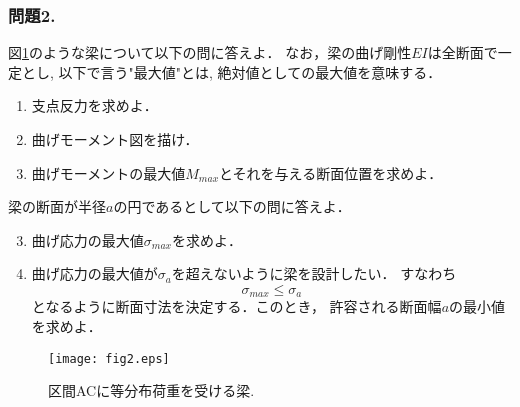 \documentclass[10pt,a4j]{jarticle}
\begin{document}
\subsubsection*{問題2.}
図\ref{fig:fig2}のような梁について以下の問に答えよ．
なお，梁の曲げ剛性$EI$は全断面で一定とし, 以下で言う"最大値"とは, 
絶対値としての最大値を意味する．
\begin{enumerate}
\item
	支点反力を求めよ．
\item
	曲げモーメント図を描け．
\item
	曲げモーメントの最大値$M_{max}$とそれを与える断面位置を求めよ．
\end{enumerate}
梁の断面が半径$a$の円であるとして以下の問に答えよ．
\begin{enumerate}
\setcounter{enumi}{2}
\item
	曲げ応力の最大値$\sigma_{max}$を求めよ．
\item
	曲げ応力の最大値が$\sigma_a$を超えないように梁を設計したい．
	すなわち
	\[
		\sigma_{max} \leq \sigma_a
	\]
	となるように断面寸法を決定する．このとき，
	許容される断面幅$a$の最小値を求めよ．
\end{enumerate}
\begin{figure}[h]
	\begin{center}
	\texttt{[image: fig2.eps]} 
	\end{center}
	\caption{区間ACに等分布荷重を受ける梁.} 
	\label{fig:fig2}
\end{figure}
\end{document}
